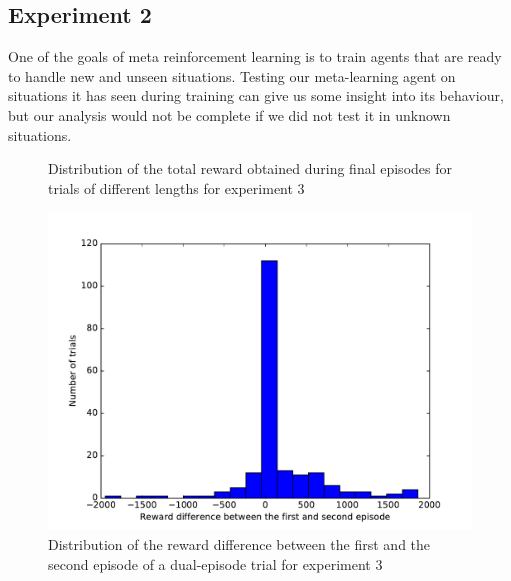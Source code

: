 \documentclass[letterpaper]{article}
\begin{document}
\subsection{Experiment 2}
One of the goals of meta reinforcement learning is to train agents that are
ready to handle new and unseen situations. Testing our meta-learning agent
on situations it has seen during training can give us some insight into
its behaviour, but our analysis would not be complete if we did not test it 
in unknown situations.
\begin{figure}
	\centering
	\caption{Distribution of the total reward obtained during final episodes
	for trials of different lengths for experiment 3}
	\label{fig:distrib_mask}
\end{figure}

\begin{figure}[h]
	\centering
	\includegraphics[width=\linewidth]{fig/reward_diff_mask.pdf}
	\caption{Distribution of the reward difference between the first
	and the second episode of a dual-episode trial for experiment 3}
	\label{fig:reward_diff_mask}
\end{figure}
\end{document}
